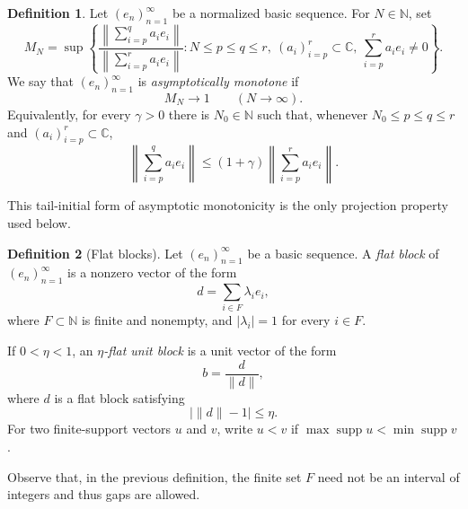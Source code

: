 \documentclass[11pt,reqno]{amsart}
\makeatletter
\theoremstyle{plain}
\theoremstyle{definition}
\newtheorem{definition}[definition]{Definition}
\newcommand{\N}{\mathbb N}
\newcommand{\C}{\mathbb C}
\DeclareMathOperator{\supp}{supp}
\newcounter{problempaper}
\newenvironment{problempaperbody}{%
  \setcounter{subsection}{0}%
  \setcounter{subsubsection}{0}%
  \setcounter{paragraph}{0}%
  \renewcommand{\thesubsection}{\arabic{subsection}}%
  \renewcommand{\thesubsubsection}{\thesubsection.\arabic{subsubsection}}%
  \renewcommand{\theparagraph}{\thesubsubsection.\arabic{paragraph}}%
  \let\problem@outersection\section
  \let\problem@outersubsection\subsection
  \let\problem@outersubsubsection\subsubsection
  \let\problem@outerparagraph\paragraph
  \let\section\problem@papersection
  \let\subsection\problem@papersubsection
  \let\subsubsection\problem@papersubsubsection
}{%
  \let\section\problem@outersection
  \let\subsection\problem@outersubsection
  \let\subsubsection\problem@outersubsubsection
  \let\paragraph\problem@outerparagraph
}
\newcommand{\problem@target}[2]{%
  \hypertarget{problem-\theproblempaper-#1-#2}{}%
}
\newcommand{\problem@paperheading}[3]{%
  \par\bigskip
  \problem@target{#1}{#2}%
  \noindent{\large\bfseries #2.\quad #3\par}%
  \nobreak\smallskip
}
\newcommand{\problem@papersubheading}[3]{%
  \par\medskip
  \problem@target{#1}{#2}%
  \noindent{\normalsize\bfseries #2.\quad #3\par}%
  \nobreak\smallskip
}
\newcommand{\problem@papersubsubheading}[3]{%
  \par\smallskip
  \problem@target{#1}{#2}%
  \noindent{\normalsize\itshape #2.\quad #3.\ }%
}
\def\problem@papersection{%
  \@ifstar{\problem@papersectionstar}{\problem@papersectionnostar}%
}
\def\problem@papersectionstar#1{%
  \par\bigskip\noindent{\large\bfseries #1\par}\nobreak\smallskip
}
\def\problem@papersectionnostar#1{%
  \refstepcounter{subsection}%
  \setcounter{subsubsection}{0}%
  \setcounter{paragraph}{0}%
  \problem@paperheading{section}{\thesubsection}{#1}%
  \problem@writecontentsline{section}{\thesubsection}{#1}%
}
\def\problem@papersubsection{%
  \@ifstar{\problem@papersubsectionstar}{\problem@papersubsectionnostar}%
}
\def\problem@papersubsectionstar#1{%
  \par\medskip\noindent{\normalsize\bfseries #1\par}\nobreak\smallskip
}
\def\problem@papersubsectionnostar#1{%
  \refstepcounter{subsubsection}%
  \setcounter{paragraph}{0}%
  \problem@papersubheading{subsection}{\thesubsubsection}{#1}%
  \problem@writecontentsline{subsection}{\thesubsubsection}{#1}%
}
\def\problem@papersubsubsection{%
  \@ifstar{\problem@papersubsubsectionstar}{\problem@papersubsubsectionnostar}%
}
\def\problem@papersubsubsectionstar#1{%
  \par\smallskip\noindent{\normalsize\itshape #1.\ }%
}
\def\problem@papersubsubsectionnostar#1{%
  \refstepcounter{paragraph}%
  \problem@papersubsubheading{subsubsection}{\theparagraph}{#1}%
  \problem@writecontentsline{subsubsection}{\theparagraph}{#1}%
}
\newcommand{\problem@writecontentsline}[3]{%
  \begingroup
  \protected@write\@auxout{}{%
    \string\problemcontentsentry{\theproblempaper}{#1}{#2}{#3}{\thepage}%
  }%
  \endgroup
}
\newcommand{\problemcontentsentry}[5]{%
  \@ifundefined{problemcontents@#1}{%
    \expandafter\gdef\csname problemcontents@#1\endcsname{}%
  }{}%
  \expandafter\g@addto@macro\csname problemcontents@#1\endcsname{%
    \problemcontentsline{#1}{#2}{#3}{#4}{#5}%
  }%
}
\newcommand{\problemcontentslink}[4]{%
  \hyperlink{problem-#1-#2-#3}{#4}%
}
\newcommand{\problemcontentsline}[5]{%
  \ifstrequal{#2}{section}{%
    \par\noindent
    \problemcontentslink{#1}{#2}{#3}{\makebox[2.5em][l]{#3}#4}%
    \nobreak\dotfill
    \problemcontentslink{#1}{#2}{#3}{#5}\par
  }{%
    \ifstrequal{#2}{subsection}{%
      \par\noindent\hspace*{1.5em}%
      \problemcontentslink{#1}{#2}{#3}{\makebox[3.5em][l]{#3}#4}%
      \nobreak\dotfill
      \problemcontentslink{#1}{#2}{#3}{#5}\par
    }{%
      \par\noindent\hspace*{3em}%
      \problemcontentslink{#1}{#2}{#3}{\makebox[4.5em][l]{#3}#4}%
      \nobreak\dotfill
      \problemcontentslink{#1}{#2}{#3}{#5}\par
    }%
  }%
}
\makeatother
\begin{document}
\begin{problempaperbody}
\begin{definition}
\label{p1-first:def:asymptotically-monotone}
Let $(e_n)_{n=1}^{\infty}$ be a normalized basic sequence. For $N\in\N$, set
\begin{equation*}
        M_N=\sup\left\{
        \frac{\left\|\sum_{i=p}^{q} a_i e_i\right\|}
             {\left\|\sum_{i=p}^{r} a_i e_i\right\|}:
        N\leq p\leq q\leq r,\ (a_i)_{i=p}^{r}\subset\C,\ 
        \sum_{i=p}^{r}a_i e_i\neq 0
        \right\}.
\end{equation*}
We say that $(e_n)_{n=1}^{\infty}$ is \emph{asymptotically monotone} if
\begin{equation*}
        M_N\longrightarrow 1 \qquad(N\to\infty).
\end{equation*}
Equivalently, for every $\gamma>0$ there is $N_0\in\N$ such that, whenever $N_0\leq p\leq q\leq r$ and $(a_i)_{i=p}^{r}\subset\C$,
\begin{equation*}
        \left\|\sum_{i=p}^{q} a_i e_i\right\|\leq (1+\gamma)\left\|\sum_{i=p}^{r} a_i e_i\right\|.
\end{equation*}
\end{definition}

This tail-initial form of asymptotic monotonicity is the only projection property used below.

\begin{definition}[Flat blocks]
\label{p1-first:def:flat-blocks}
Let $(e_n)_{n=1}^{\infty}$ be a basic sequence. A \emph{flat block} of $(e_n)_{n=1}^{\infty}$ is a nonzero vector of the form
\begin{equation*}
        d=\sum_{i\in F}\lambda_i e_i,
\end{equation*}
where $F\subset\N$ is finite and nonempty, and $|\lambda_i|=1$ for every $i\in F$.

If $0<\eta<1$, an \emph{$\eta$-flat unit block} is a unit vector of the form
\begin{equation*}
        b=\frac{d}{\|d\|},
\end{equation*}
where $d$ is a flat block satisfying
\begin{equation*}
        |\|d\|-1|\leq \eta.
\end{equation*}
For two finite-support vectors $u$ and $v$, write $u<v$ if $\max\supp u<\min\supp v$.
\end{definition}

Observe that, in the previous definition, the finite set $F$ need not be an interval of integers and thus gaps are allowed.



\end{problempaperbody}
\end{document}
